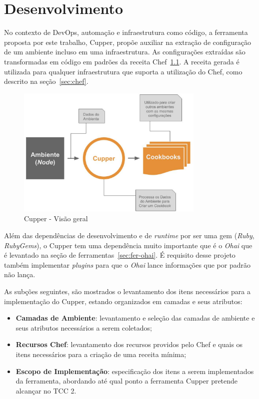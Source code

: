 \chapter{Desenvolvimento}
\label{chap:desenv}

No contexto de DevOps, automação e infraestrutura como código, a ferramenta
proposta por este trabalho, Cupper, propõe auxiliar na extração de configuração
de um ambiente incluso em uma infraestrutura. As configurações extraídas são
transformadas em código em padrões da receita Chef~\ref{fig:cupper_geral}. A
receita gerada é utilizada para qualquer infraestrutura que suporta a
utilização do Chef, como descrito na seção~\ref{sec:chef}.

\begin{figure}[h]
  \centering
  \includegraphics[width=0.8\textwidth]{figuras/cupper_geral.eps}
  \caption{Cupper - Visão geral}
  \label{fig:cupper_geral}
\end{figure}

Além das dependências de desenvolvimento e de \textit{runtime} por ser uma gem
(\textit{Ruby}, \textit{RubyGems}), o Cupper tem uma dependência muito
importante que é o \textit{Ohai} que é levantado na seção de 
ferramentas~\ref{sec:fer-ohai}. É requisito desse projeto também implementar
\textit{plugins} para que o \textit{Ohai} lance informações que por padrão 
não lança.

As subções seguintes, são mostrados o levantamento dos itens necessários para
a implementação do Cupper, estando organizados em camadas e seus atributos:

\begin{itemize}
  \item \textbf{Camadas de Ambiente}: levantamento e seleção das camadas de ambiente
    e seus atributos necessários a serem coletados;
  \item \textbf{Recursos Chef}: levantamento dos recursos providos pelo Chef e quais os
    itens necessários para a criação de uma receita mínima;
  \item \textbf{Escopo de Implementação}: especificação dos itens a serem implementados
    da ferramenta, abordando até qual ponto a ferramenta Cupper pretende alcançar
    no TCC 2.
\end{itemize}




